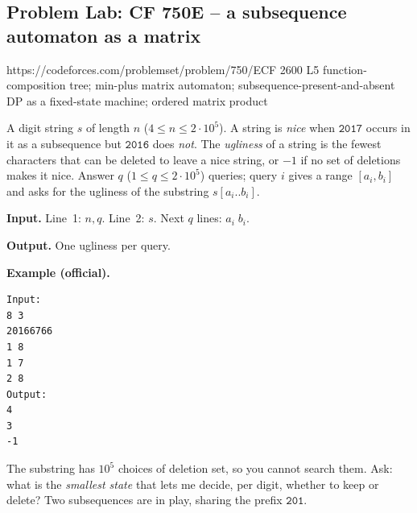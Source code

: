 \subsection{Problem Lab: CF 750E -- a subsequence automaton as a matrix}

  {https://codeforces.com/problemset/problem/750/E}{CF 2600 L5}
  {function-composition tree; min-plus matrix automaton; subsequence-present-and-absent DP as a fixed-state machine; ordered matrix product}

\begin{problemstatement}
A digit string \(s\) of length \(n\) (\(4\le n\le 2\cdot10^5\)).  A string is
\emph{nice} when \(\texttt{2017}\) occurs in it as a subsequence but
\(\texttt{2016}\) does \emph{not}.  The \emph{ugliness} of a string is the fewest
characters that can be deleted to leave a nice string, or \(-1\) if no set of
deletions makes it nice.  Answer \(q\) (\(1\le q\le 2\cdot10^5\)) queries; query
\(i\) gives a range \([a_i,b_i]\) and asks for the ugliness of the substring
\(s[a_i..b_i]\).

\textbf{Input.} Line~1: \(n,q\).  Line~2: \(s\).  Next \(q\) lines: \(a_i\;b_i\).

\textbf{Output.} One ugliness per query.

\textbf{Example (official).}
\begin{verbatim}
Input:
8 3
20166766
1 8
1 7
2 8
Output:
4
3
-1
\end{verbatim}
\end{problemstatement}

\begin{attemptgate}
The substring has \(10^5\) choices of deletion set, so you cannot search them.
Ask: what is the \emph{smallest state} that lets me decide, per digit, whether to
keep or delete?  Two subsequences are in play, sharing the prefix \(\texttt{201}\).
\end{attemptgate}

